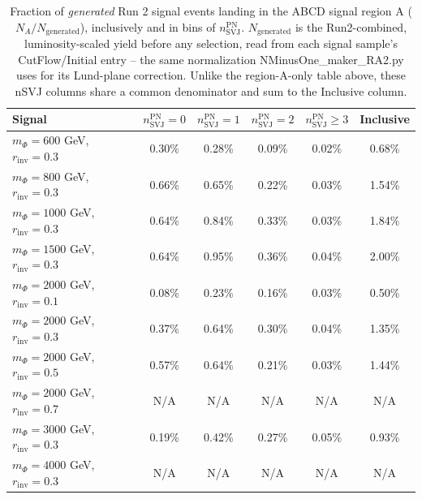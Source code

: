 \begin{table}[htbp]
\centering
\begin{tabular}{|l|c|c|c|c|c|}
    \hline
    Signal & $n_{\mathrm{SVJ}}^{\mathrm{PN}} = 0$ & $n_{\mathrm{SVJ}}^{\mathrm{PN}} = 1$ & $n_{\mathrm{SVJ}}^{\mathrm{PN}} = 2$ & $n_{\mathrm{SVJ}}^{\mathrm{PN}} \geq 3$ & Inclusive \\
    \hline
    $m_{\Phi}=600$ GeV, $r_{\mathrm{inv}}=0.3$ & 0.30\% & 0.28\% & 0.09\% & 0.02\% & 0.68\% \\
    $m_{\Phi}=800$ GeV, $r_{\mathrm{inv}}=0.3$ & 0.66\% & 0.65\% & 0.22\% & 0.03\% & 1.54\% \\
    $m_{\Phi}=1000$ GeV, $r_{\mathrm{inv}}=0.3$ & 0.64\% & 0.84\% & 0.33\% & 0.03\% & 1.84\% \\
    $m_{\Phi}=1500$ GeV, $r_{\mathrm{inv}}=0.3$ & 0.64\% & 0.95\% & 0.36\% & 0.04\% & 2.00\% \\
    $m_{\Phi}=2000$ GeV, $r_{\mathrm{inv}}=0.1$ & 0.08\% & 0.23\% & 0.16\% & 0.03\% & 0.50\% \\
    $m_{\Phi}=2000$ GeV, $r_{\mathrm{inv}}=0.3$ & 0.37\% & 0.64\% & 0.30\% & 0.04\% & 1.35\% \\
    $m_{\Phi}=2000$ GeV, $r_{\mathrm{inv}}=0.5$ & 0.57\% & 0.64\% & 0.21\% & 0.03\% & 1.44\% \\
    $m_{\Phi}=2000$ GeV, $r_{\mathrm{inv}}=0.7$ & N/A & N/A & N/A & N/A & N/A \\
    $m_{\Phi}=3000$ GeV, $r_{\mathrm{inv}}=0.3$ & 0.19\% & 0.42\% & 0.27\% & 0.05\% & 0.93\% \\
    $m_{\Phi}=4000$ GeV, $r_{\mathrm{inv}}=0.3$ & N/A & N/A & N/A & N/A & N/A \\
    \hline
\end{tabular}
\caption{Fraction of \emph{generated} Run 2 signal events landing in the ABCD signal region A ($N_A / N_{\mathrm{generated}}$), inclusively and in bins of $n_{\mathrm{SVJ}}^{\mathrm{PN}}$. $N_{\mathrm{generated}}$ is the Run2-combined, luminosity-scaled yield before any selection, read from each signal sample's CutFlow/Initial entry -- the same normalization NMinusOne\_maker\_RA2.py uses for its Lund-plane correction. Unlike the region-A-only table above, these nSVJ columns share a common denominator and sum to the Inclusive column.}
\label{table:signal_region_a_vs_generated}
\end{table}
